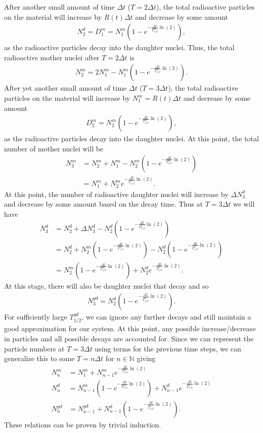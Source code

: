 \documentclass[11pt]{article}
\begin{document}
After another small amount of time $\Delta t$ ($T=2\Delta t$), the total radioactive particles on the material will increase by $R(t)\Delta t$ and decrease by some amount 
\begin{align}
N^d_2=D^m_1=N^m_1\left(1-e^{-\frac{\Delta t}{T^m_{1/2}}\ln(2)}\right),
\end{align} 
as the radioactive particles decay into the daughter nuclei. Thus, the total radioactive mother nuclei after $T=2\Delta t$ is \begin{align}
N^m_2=2N^m_1 - N^m_1\left(1-e^{-\frac{\Delta t}{T^m_{1/2}}\ln(2)}\right).
\end{align}
After yet another small amount of time $\Delta t$ ($T=3\Delta t$), the total radioactive particles on the material will increase by $N^m_1=R(t)\Delta t$ and decrease by some amount
\begin{align}
D^m_2 = N^m_2\left(1-e^{-\frac{\Delta t}{T^m_{1/2}}\ln(2)}\right),
\end{align} 
as the radioactive particles decay into the daughter nuclei. At this point, the total number of mother nuclei will be
\begin{align}
N^m_3 &= N^m_2+N^m_1-N^m_2\left(1-e^{-\frac{\Delta t}{T^m_{1/2}}\ln(2)}\right) \\
&= N^m_1+N^m_2e^{-\frac{\Delta t}{T^m_{1/2}}\ln(2)}.
\end{align}
At this point, the number of radioactive daughter nuclei will increase by $\Delta N^d_3$ and decrease by some amount based on the decay time. Thus at $T=3\Delta t$ we will have
\begin{align}
N^d_3 &= N^d_2+\Delta N^d_3-N^d_2\left(1-e^{-\frac{\Delta t}{T^d_{1/2}}\ln(2)}\right) \\
&=N^d_2+N^m_2\left(1-e^{-\frac{\Delta t}{T^m_{1/2}}\ln(2)}\right)-N^d_2\left(1-e^{-\frac{\Delta t}{T^d_{1/2}}\ln(2)}\right) \\
&=N^m_2\left(1-e^{-\frac{\Delta t}{T^m_{1/2}}\ln(2)}\right)+N^d_2e^{-\frac{\Delta t}{T^d_{1/2}}\ln(2)}.
\end{align}
At this stage, there will also be daughter nuclei that decay and so 
\begin{align}
N^{gd}_3 = N^d_2\left(1-e^{-\frac{\Delta t}{T^d_{1/2}}\ln(2)}\right).
\end{align}
For sufficiently large $T^{gd}_{1/2}$, we can ignore any further decays and still maintain a good approximation for our system. At this point, any possible increase/decrease in particles and all possible decays are accounted for. Since we can represent the particle numbers at $T=3\Delta t$ using terms for the previous time steps, we can generalize this to some $T=n\Delta t$ for $n\in\mathbb{N}$ giving
\begin{align}
N^m_n &= N^m_1+N^m_{n-1}e^{-\frac{\Delta t}{T^m_{1/2}}\ln(2)} \label{Nm} \\
N^d_n &= N^m_{n-1}\left(1-e^{-\frac{\Delta t}{T^m_{1/2}}\ln(2)}\right)+N^d_{n-1}e^{-\frac{\Delta t}{T^d_{1/2}}\ln(2)}\label{Nd} \\
N^{gd}_n &= N^{gd}_{n-1}+N^d_{n-1}\left(1-e^{-\frac{\Delta t}{T^d_{1/2}}\ln(2)}\right). \label{Ngd}
\end{align}
These relations can be proven by trivial induction.
\end{document}
